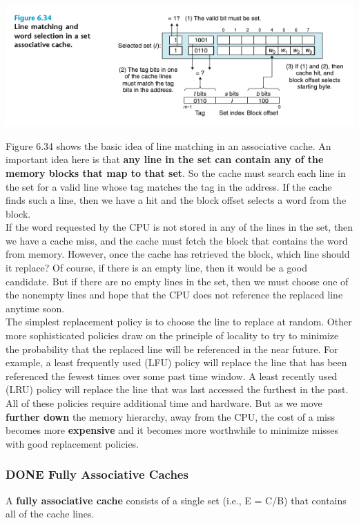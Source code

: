 \documentclass[11pt]{article}
\begin{document}
\begin{center}
\includegraphics[width=.9\linewidth]{pics/figure6.34-associative-cache.png}
\end{center}

Figure 6.34 shows the basic idea of line matching in an associative cache. An important idea here is that \textbf{any line in the set can contain any of the memory blocks that map to that set}. So the cache must search each line in the set for a valid line whose tag matches the tag in the address. If the cache finds such a line, then we have a hit and the block offset selects a word from the block.\\

If the word requested by the CPU is not stored in any of the lines in the set, then we have a cache miss, and the cache must fetch the block that contains the word from memory. However, once the cache has retrieved the block, which line should it replace? Of course, if there is an empty line, then it would be a good candidate. But if there are no empty lines in the set, then we must choose one of the nonempty lines and hope that the CPU does not reference the replaced line anytime soon.\\


The simplest replacement policy is to choose the line to replace at random. Other more sophisticated policies draw on the principle of locality to try to minimize the probability that the replaced line will be referenced in the near future. For example, a least frequently used (LFU) policy will replace the line that has been referenced the fewest times over some past time window. A least recently used (LRU) policy will replace the line that was last accessed the furthest in the past. All of these policies require additional time and hardware. But as we move \textbf{further down} the memory hierarchy, away from the CPU, the cost of a miss becomes more \textbf{expensive} and it becomes more worthwhile to minimize misses with good replacement policies.\\


\subsubsection{{\bfseries\sffamily DONE} Fully Associative Caches}
\label{sec:org8a20bf9}
A \textbf{fully associative cache} consists of a single set (i.e., E = C/B) that contains all of the cache lines.\\
\end{document}
